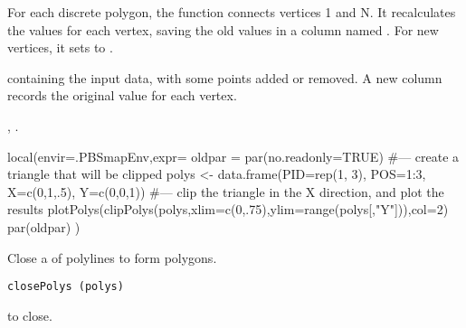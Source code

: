 \documentclass[letterpaper]{book}
\begin{document}
%
\begin{Details}\relax
For each discrete polygon, the function connects vertices 1 and N.  It
recalculates the  values for each vertex, saving the old
values in a column named .  For new vertices, it sets
 to .
\end{Details}
%
\begin{Value}
 containing the input data, with some points added or
removed.  A new column  records the original 
value for each vertex.
\end{Value}
%
\begin{SeeAlso}\relax
{},
.
\end{SeeAlso}
%
\begin{Examples}
\begin{ExampleCode}
local(envir=.PBSmapEnv,expr={
  oldpar = par(no.readonly=TRUE)
  #--- create a triangle that will be clipped
  polys <- data.frame(PID=rep(1, 3), POS=1:3, X=c(0,1,.5), Y=c(0,0,1))
  #--- clip the triangle in the X direction, and plot the results
  plotPolys(clipPolys(polys,xlim=c(0,.75),ylim=range(polys[,"Y"])),col=2)
  par(oldpar)
})
\end{ExampleCode}
\end{Examples}
%
\begin{Description}\relax
Close a  of polylines to form polygons.
\end{Description}
%
\begin{Usage}
\begin{verbatim}
closePolys (polys)
\end{verbatim}
\end{Usage}
%
\begin{Arguments}
\begin{ldescription}
\item[\code{polys}]  to close.
\end{ldescription}
\end{Arguments}
%
\end{document}
